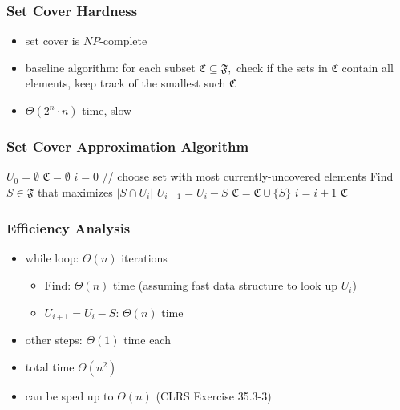 \documentclass{beamer}
\begin{document}
\begin{frame} \frametitle{Set Cover Hardness}
  \begin{itemize}
    \item set cover is $NP$-complete
    \item baseline algorithm: for each subset $\mathfrak{C} \subseteq \mathfrak{F},$ check if the sets in $\mathfrak{C}$ contain all elements, keep track of the smallest such $\mathfrak{C}$
    \item $\Theta(2^n \cdot n)$ time, slow
  \end{itemize}
\end{frame}

\begin{frame} \frametitle{Set Cover Approximation Algorithm}
  \begin{algorithmic}[1]
      \State $U_0=\emptyset$ 
      \State $\mathfrak{C} = \emptyset$
      \State $i=0$
        \State // choose set with most currently-uncovered elements
        \State Find $S \in \mathfrak{F}$ that maximizes $|S \cap U_i|$  
        \State $U_{i+1} = U_i - S$
        \State $\mathfrak{C} = \mathfrak{C} \cup \{S\}$
        \State $i = i + 1$
      \EndWhile
      \State \Return $\mathfrak{C}$
    \EndFunction
  \end{algorithmic}
\end{frame}

\begin{frame} \frametitle{Efficiency Analysis}
  \begin{itemize}
    \item while loop: $\Theta(n)$ iterations
    \begin{itemize}
      \item Find: $\Theta(n)$ time (assuming fast data structure to look up $U_i$)
      \item $U_{i+1} = U_i - S$: $\Theta(n)$ time
    \end{itemize}
    \item other steps: $\Theta(1)$ time each
    \item total time $\Theta(n^2)$ 
    \item can be sped up to $\Theta(n)$ (CLRS Exercise 35.3-3)
  \end{itemize}
\end{frame}
\end{document}
